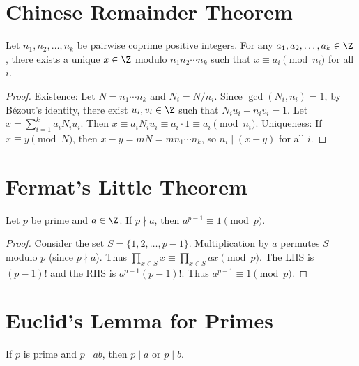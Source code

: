 \section{Chinese Remainder Theorem}
\label{sec:chinese-remainder}

\begin{theorem}
\label{thm:chinese-remainder}
Let $n_1, n_2, \ldots, n_k$ be pairwise coprime positive integers. For any $a_1, a_2, \ldots, a_k \in \Z$, there exists a unique $x \in \Z$ modulo $n_1 n_2 \cdots n_k$ such that $x \equiv a_i \pmod{n_i}$ for all $i$.
\end{theorem}

\begin{proof}
Existence: Let $N = n_1 \cdots n_k$ and $N_i = N/n_i$. Since $\gcd(N_i, n_i) = 1$, by Bézout's identity, there exist $u_i, v_i \in \Z$ such that $N_i u_i + n_i v_i = 1$. Let $x = \sum_{i=1}^k a_i N_i u_i$. Then $x \equiv a_i N_i u_i \equiv a_i \cdot 1 \equiv a_i \pmod{n_i}$. Uniqueness: If $x \equiv y \pmod{N}$, then $x - y = mN = m n_1 \cdots n_k$, so $n_i \mid (x - y)$ for all $i$.
\end{proof}

\section{Fermat's Little Theorem}
\label{sec:fermat-little}

\begin{theorem}
\label{thm:fermat-little}
Let $p$ be prime and $a \in \Z$. If $p \nmid a$, then $a^{p-1} \equiv 1 \pmod p$.
\end{theorem}

\begin{proof}
Consider the set $S = \{1, 2, \ldots, p-1\}$. Multiplication by $a$ permutes $S$ modulo $p$ (since $p \nmid a$). Thus $\prod_{x \in S} x \equiv \prod_{x \in S} ax \pmod p$. The LHS is $(p-1)!$ and the RHS is $a^{p-1}(p-1)!$. Thus $a^{p-1} \equiv 1 \pmod p$.
\end{proof}

\section{Euclid's Lemma for Primes}
\label{sec:euclid-primes-lemma}

\begin{theorem}
\label{thm:euclid-primes-lemma}
If $p$ is prime and $p \mid ab$, then $p \mid a$ or $p \mid b$.
\end{theorem}

